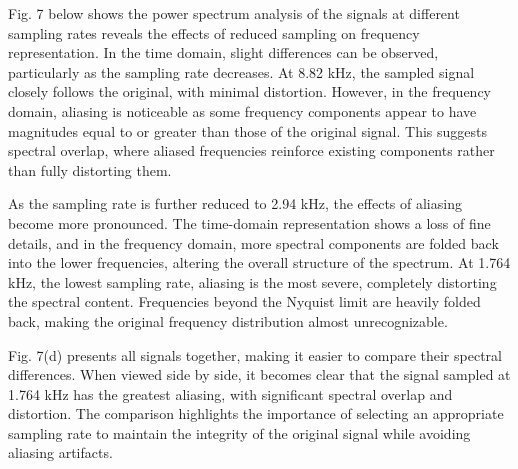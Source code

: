 \documentclass[12pt]{article}
\begin{document}
\FloatBarrier
Fig. 7 below shows the power spectrum analysis of the signals at different sampling rates reveals the effects of reduced sampling on frequency representation. In the time domain, slight differences can be observed, particularly as the sampling rate decreases. At 8.82 kHz, the sampled signal closely follows the original, with minimal distortion. However, in the frequency domain, aliasing is noticeable as some frequency components appear to have magnitudes equal to or greater than those of the original signal. This suggests spectral overlap, where aliased frequencies reinforce existing components rather than fully distorting them.

As the sampling rate is further reduced to 2.94 kHz, the effects of aliasing become more pronounced. The time-domain representation shows a loss of fine details, and in the frequency domain, more spectral components are folded back into the lower frequencies, altering the overall structure of the spectrum. At 1.764 kHz, the lowest sampling rate, aliasing is the most severe, completely distorting the spectral content. Frequencies beyond the Nyquist limit are heavily folded back, making the original frequency distribution almost unrecognizable.

Fig. 7(d) presents all signals together, making it easier to compare their spectral differences. When viewed side by side, it becomes clear that the signal sampled at 1.764 kHz has the greatest aliasing, with significant spectral overlap and distortion. The comparison highlights the importance of selecting an appropriate sampling rate to maintain the integrity of the original signal while avoiding aliasing artifacts.
\end{document}
